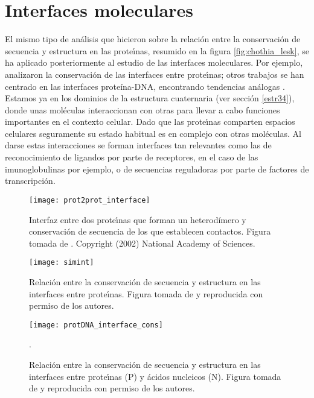\section{Interfaces moleculares}

El mismo tipo de an\'{a}lisis que hicieron \citet{Chothia1986} sobre la relaci\'{o}n entre la conservaci\'{o}n de secuencia
y estructura en las prote\'\i{}nas, resumido en la figura \ref{fig:chothia_lesk}, se ha aplicado posteriormente al estudio de 
las interfaces moleculares. Por ejemplo, \cite{Aloy2002a} %
analizaron la conservaci\'{o}n de las interfaces entre prote\'\i{}nas; otros trabajos se han centrado en las interfaces prote\'{i}na-DNA, 
encontrando tendencias an\'{a}logas \citep{ContrerasMoreira2006}.
Estamos ya en los dominios de la estructura cuaternaria (ver secci\'{o}n \ref{estr34}),
donde unas mol\'{e}culas interaccionan con otras para llevar a cabo funciones importantes en el contexto celular. 
Dado que las prote\'\i{}nas comparten espacios celulares seguramente su estado habitual es en complejo con otras mol\'{e}culas.
Al darse estas interacciones se forman interfaces tan relevantes como las de reconocimiento de ligandos por parte de receptores,
en el caso de las imunoglobulinas por ejemplo, o de secuencias reguladoras por parte de factores de transcripci\'{o}n.

\begin{figure}
\begin{center} 
\texttt{[image: prot2prot\_interface]}
\caption%
{
Interfaz entre dos prote\'\i{}nas que forman un heterod\'{i}mero y conservaci\'{o}n de secuencia de los que establecen contactos. 
Figura tomada de \citet{Aloy2002a}. Copyright (2002) National Academy of Sciences.
}
\label{fig:prot2protI}
\end{center}
\end{figure}

\begin{figure}
\begin{center} 
\texttt{[image: simint]}
\caption%
{
Relaci\'{o}n entre la conservaci\'{o}n de secuencia y estructura en las interfaces entre prote\'\i{}nas.
Figura tomada de \citet{Aloy2003} y reproducida con permiso de los autores.
}
\label{fig:prot2prot_cons}
\end{center}
\end{figure}

\begin{figure}
\begin{center} 
\texttt{[image: protDNA\_interface\_cons]}
\caption%
{
Relaci\'{o}n entre la conservaci\'{o}n de secuencia y estructura en las interfaces entre 
prote\'\i{}nas (P) y \'{a}cidos nucleicos (N). Figura tomada de \citet{ContrerasMoreira2006}
y reproducida con permiso de los autores.}.
\label{fig:prot2DNA_cons}
\end{center}
\end{figure}


